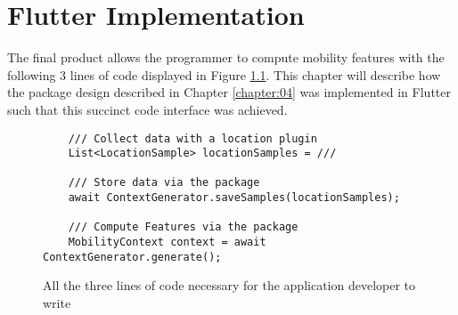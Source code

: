 \chapter{Flutter Implementation}
\label{chapter:05}
The final product allows the programmer to compute mobility features with the following 3 lines of code displayed in Figure \ref{fig:code-example-intro}. This chapter will describe how the package design described in Chapter \ref{chapter:04} was implemented in Flutter such that this succinct code interface was achieved. 

\begin{figure}[h]
    \centering
    \begin{verbatim}
    /// Collect data with a location plugin
    List<LocationSample> locationSamples = ///

    /// Store data via the package
    await ContextGenerator.saveSamples(locationSamples);
    
    /// Compute Features via the package
    MobilityContext context = await ContextGenerator.generate();
    \end{verbatim}
    \caption{All the three lines of code necessary for the application developer to write}
    \label{fig:code-example-intro}
\end{figure}









